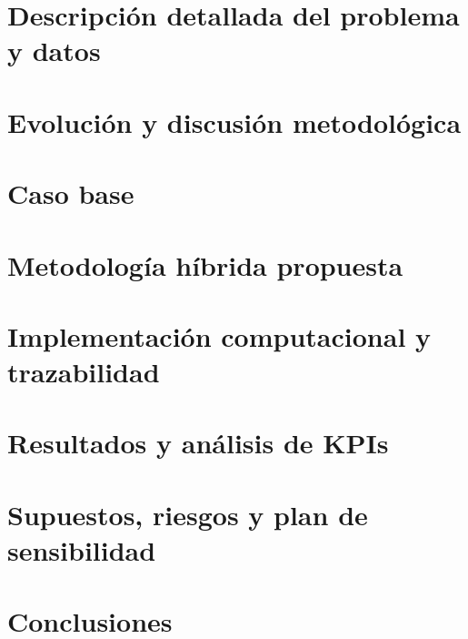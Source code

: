 \documentclass[pdftex,spanish]{pucthesis}	%
\begin{document}
\chapter[DESCRIPCIÓN DETALLADA DEL PROBLEMA Y DATOS]{Descripción detallada del problema y datos} \label{ch:problema}


\chapter[EVOLUCIÓN Y DISCUSIÓN METODOLÓGICA]{Evolución y discusión metodológica} \label{ch:evolucion}


\chapter[CASO BASE]{Caso base} \label{ch:caso-base}


\chapter[METODOLOGÍA HÍBRIDA PROPUESTA]{Metodología híbrida propuesta} \label{ch:metodologia}


\chapter[IMPLEMENTACIÓN COMPUTACIONAL Y TRAZABILIDAD]{Implementación computacional y trazabilidad} \label{ch:implementacion}


\chapter[RESULTADOS Y ANÁLISIS DE KPIS]{Resultados y análisis de KPIs} \label{ch:resultados}


\chapter[SUPUESTOS, RIESGOS Y PLAN DE SENSIBILIDAD]{Supuestos, riesgos y plan de sensibilidad} \label{ch:supuestos}


\chapter[CONCLUSIONES]{Conclusiones} \label{ch:conclusiones}

\end{document}

